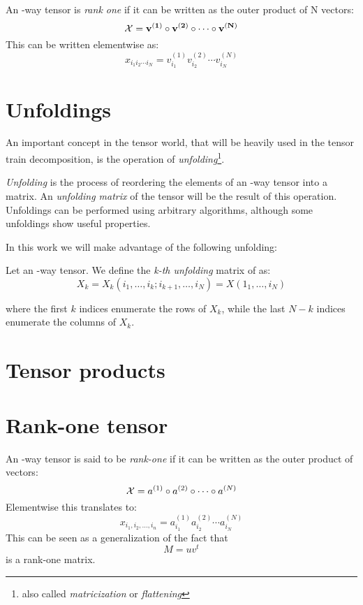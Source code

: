 \begin{Def}
  An \N-way tensor \X is \emph{rank one} if it can be written as the outer product of N vectors:
  \[
  \mathcal{X} = \mathbf{v^{(1)}} \circ \mathbf{v^{(2)}} \circ \cdots \circ \mathbf{v^{(N)}}
  \]
  This can be written elementwise as:
  \[
  x_{i_1 i_2 \cdots i_N} = v_{i_1}^{(1)} v_{i_2}^{(2)} \cdots v_{i_N}^{(N)}
  \]
\end{Def}

\section{Unfoldings}
An important concept in the tensor world, that will be heavily used in the tensor train decomposition, is the operation of \emph{unfolding}\footnote{also called \emph{matricization} or \emph{flattening}}.

\emph{Unfolding} is the process of reordering the elements of an \N-way tensor into a matrix. An \emph{unfolding matrix} of the tensor will be the result of this operation. Unfoldings can be performed using arbitrary algorithms, although some unfoldings show useful properties.

In this work we will make advantage of the following unfolding:

\begin{Def}
  Let \X an \N-way tensor. We define the \emph{k-th unfolding} matrix of \X as:
  \begin{equation} \label{def:unfolding}
    X_k = X_k(i_1,\dots,i_k;i_{k+1},\dots,i_N) = X(1_1,\dots,i_N)
  \end{equation}

where the first $k$ indices enumerate the rows of $X_k$, while the last $N - k$ indices enumerate the columns of $X_k$.
\end{Def}

\section{Tensor products}

\section{Rank-one tensor}
An \N-way tensor \X is said to be \emph{rank-one} if it can be written as the outer product of \N vectors:
\begin{equation}
  \mathcal{X} = a^{(1)} \circ a^{(2)} \circ \cdots \circ a^{(N)}
\end{equation}
Elementwise this translates to:
\begin{equation}
  x_{i_1,i_2,\ldots,i_n} = a_{i_1}^{(1)} a_{i_2}^{(2)} \cdots a_{i_N}^{(N)}
\end{equation}
This can be seen as a generalization of the fact that
\begin{equation*}
  M = u v^t
\end{equation*}
is a rank-one matrix.

